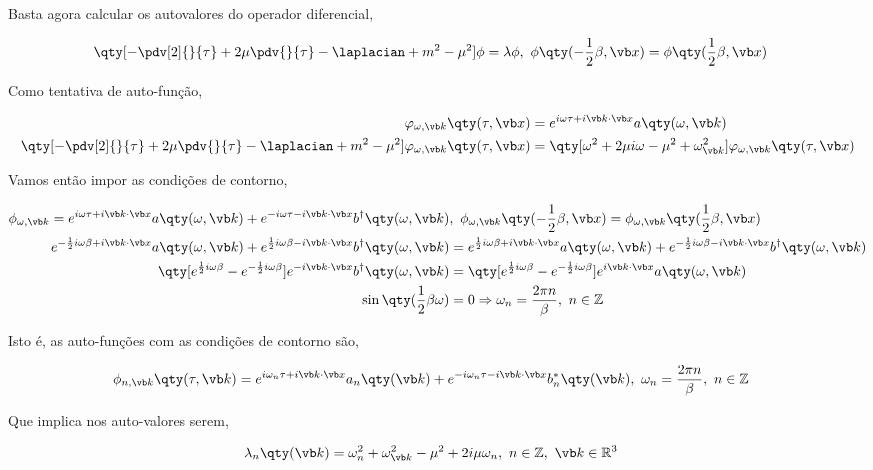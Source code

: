 \documentclass[twoside]{amsart}
\numberwithin{equation}{section}
\begin{document}
\begin{refsection}
Basta agora calcular os autovalores do operador diferencial,

\begin{align}
    \qty[-\pdv[2]{}{\tau}+2\mu\pdv{}{\tau}-\laplacian+m^2-\mu^2]\phi&=\lambda\phi,\ \phi\qty(-\frac12\beta,\vb x)=\phi\qty(\frac12\beta,\vb x)
\end{align}

Como tentativa de auto-função,

\begin{align}
    \varphi_{\omega,\vb k}\qty(\tau,\vb x)&=e^{i\omega\tau+i\vb k\cdot\vb x}a\qty(\omega,\vb k)\\
    \qty[-\pdv[2]{}{\tau}+2\mu\pdv{}{\tau}-\laplacian+m^2-\mu^2]\varphi_{\omega,\vb k}\qty(\tau,\vb x)&=\qty[\omega^2+2\mu i\omega-\mu^2+\omega_{\vb k}^2]\varphi_{\omega,\vb k}\qty(\tau,\vb x)
\end{align}

Vamos então impor as condições de contorno,

\begin{align}
    \phi_{\omega,\vb k}=e^{i\omega\tau+i\vb k\cdot\vb x}a\qty(\omega,\vb k)+e^{-i\omega\tau-i\vb k\cdot\vb x}b^\dagger\qty(\omega,\vb k)&,\ \phi_{\omega,\vb k}\qty(-\frac12\beta,\vb x)=\phi_{\omega,\vb k}\qty(\frac12\beta,\vb x)\\
    e^{-\frac12i\omega\beta+i\vb k\cdot\vb x}a\qty(\omega,\vb k)+e^{\frac12i\omega\beta-i\vb k\cdot\vb x}b^\dagger\qty(\omega,\vb k)&=e^{\frac12i\omega\beta+i\vb k\cdot\vb x}a\qty(\omega,\vb k)+e^{-\frac12i\omega\beta-i\vb k\cdot\vb x}b^\dagger\qty(\omega,\vb k)\\
    \qty[e^{\frac12i\omega\beta}-e^{-\frac12i\omega\beta}]e^{-i\vb k\cdot\vb x}b^\dagger\qty(\omega,\vb k)&=\qty[e^{\frac12i\omega\beta}-e^{-\frac12i\omega\beta}]e^{i\vb k\cdot\vb x}a\qty(\omega,\vb k)\\
    \sin\qty(\frac12\beta\omega)&=0\Rightarrow \omega_n=\frac{2\pi n}{\beta},\ n\in\mathbb Z
\end{align}

Isto é, as auto-funções com as condições de contorno são,

\begin{align}
    \phi_{n,\vb k}\qty(\tau,\vb k)&=e^{i\omega_n\tau+i\vb k\cdot\vb x}a_n\qty(\vb k)+e^{-i\omega_n\tau-i\vb k\cdot\vb x}b_n^\ast\qty(\vb k),\ \omega_n=\frac{2\pi n}{\beta},\ n\in\mathbb Z
\end{align}

Que implica nos auto-valores serem,

\begin{align}
    \lambda_n\qty(\vb k)&=\omega_n^2+\omega_{\vb k}^2-\mu^2+2i\mu\omega_n,\ n\in\mathbb Z,\ \vb k \in\mathbb R^3
\end{align}


\end{refsection}
\end{document}
